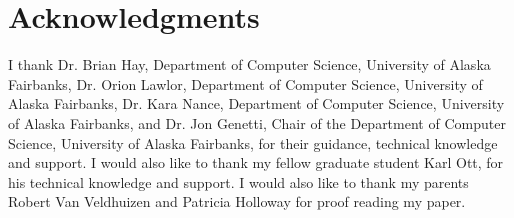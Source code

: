 \section*{Acknowledgments}
I thank Dr. Brian Hay, Department of Computer Science, University of Alaska Fairbanks, Dr. Orion Lawlor, Department of Computer Science, University of Alaska Fairbanks, Dr. Kara Nance, Department of Computer Science, University of Alaska Fairbanks, and Dr. Jon Genetti, Chair of the Department of Computer Science, University of Alaska Fairbanks, for their guidance, technical knowledge and support. I would also like to thank my fellow graduate student Karl Ott, for his technical knowledge and support. I would also like to thank my parents Robert Van Veldhuizen and Patricia Holloway for proof reading my paper.